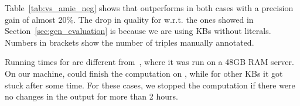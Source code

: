 Table~\ref{tab:vs_amie_neg} shows that \krd outperforms \amie in both cases with a precision gain of almost 20\%. The drop in quality for \krd w.r.t. the ones showed in Section~\ref{sec:gen_evaluation} is because we are using %
KBs without literals.
Numbers in brackets show the number of triples manually annotated. 


Running times for \amie are different from~\cite{galarraga2015fast}, where it was run on a 48GB RAM server. On our machine, \amie could finish the computation  on , while for other KBs it got stuck after some time. For these cases, we stopped the computation if there were no changes in the output for more than 2 hours.

